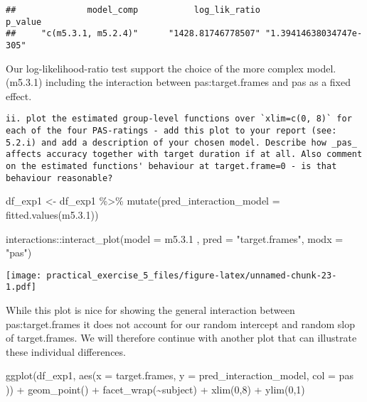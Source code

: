 \documentclass[
]{article}
\newenvironment{Shaded}{\begin{snugshade}}{\end{snugshade}}
\newcommand{\AttributeTok}[1]{\textcolor[rgb]{0.77,0.63,0.00}{#1}}
\newcommand{\DecValTok}[1]{\textcolor[rgb]{0.00,0.00,0.81}{#1}}
\newcommand{\FloatTok}[1]{\textcolor[rgb]{0.00,0.00,0.81}{#1}}
\newcommand{\FunctionTok}[1]{\textcolor[rgb]{0.00,0.00,0.00}{#1}}
\newcommand{\NormalTok}[1]{#1}
\newcommand{\OtherTok}[1]{\textcolor[rgb]{0.56,0.35,0.01}{#1}}
\newcommand{\SpecialCharTok}[1]{\textcolor[rgb]{0.00,0.00,0.00}{#1}}
\newcommand{\StringTok}[1]{\textcolor[rgb]{0.31,0.60,0.02}{#1}}
\begin{document}
\begin{verbatim}
##              model_comp           log_lik_ratio                 p_value 
##     "c(m5.3.1, m5.2.4)"      "1428.81746778507" "1.39414638034747e-305"
\end{verbatim}

Our log-likelihood-ratio test support the choice of the more complex
model. (m5.3.1) including the interaction between pas:target.frames and
pas as a fixed effect.

\begin{verbatim}
ii. plot the estimated group-level functions over `xlim=c(0, 8)` for each of the four PAS-ratings - add this plot to your report (see: 5.2.i) and add a description of your chosen model. Describe how _pas_ affects accuracy together with target duration if at all. Also comment on the estimated functions' behaviour at target.frame=0 - is that behaviour reasonable?  
\end{verbatim}

\begin{Shaded}
\begin{Highlighting}[]
\NormalTok{df\_exp1 }\OtherTok{\textless{}{-}}\NormalTok{ df\_exp1 }\SpecialCharTok{\%\textgreater{}\%} 
  \FunctionTok{mutate}\NormalTok{(}\AttributeTok{pred\_interaction\_model =} \FunctionTok{fitted.values}\NormalTok{(m5.}\FloatTok{3.1}\NormalTok{))}


\NormalTok{interactions}\SpecialCharTok{::}\FunctionTok{interact\_plot}\NormalTok{(}\AttributeTok{model =}\NormalTok{ m5.}\FloatTok{3.1}\NormalTok{ , }\AttributeTok{pred =} \StringTok{"target.frames"}\NormalTok{, }\AttributeTok{modx =} \StringTok{"pas"}\NormalTok{)}
\end{Highlighting}
\end{Shaded}

\texttt{[image: practical\_exercise\_5\_files/figure-latex/unnamed-chunk-23-1.pdf]}

While this plot is nice for showing the general interaction between
pas:target.frames it does not account for our random intercept and
random slop of target.frames. We will therefore continue with another
plot that can illustrate these individual differences.

\begin{Shaded}
\begin{Highlighting}[]
\FunctionTok{ggplot}\NormalTok{(df\_exp1, }\FunctionTok{aes}\NormalTok{(}\AttributeTok{x =}\NormalTok{ target.frames, }\AttributeTok{y =}\NormalTok{ pred\_interaction\_model, }\AttributeTok{col =}\NormalTok{ pas )) }\SpecialCharTok{+} \FunctionTok{geom\_point}\NormalTok{() }\SpecialCharTok{+} \FunctionTok{facet\_wrap}\NormalTok{(}\SpecialCharTok{\textasciitilde{}}\NormalTok{subject) }\SpecialCharTok{+} \FunctionTok{xlim}\NormalTok{(}\DecValTok{0}\NormalTok{,}\DecValTok{8}\NormalTok{) }\SpecialCharTok{+} \FunctionTok{ylim}\NormalTok{(}\DecValTok{0}\NormalTok{,}\DecValTok{1}\NormalTok{)}
\end{Highlighting}
\end{Shaded}
\end{document}
